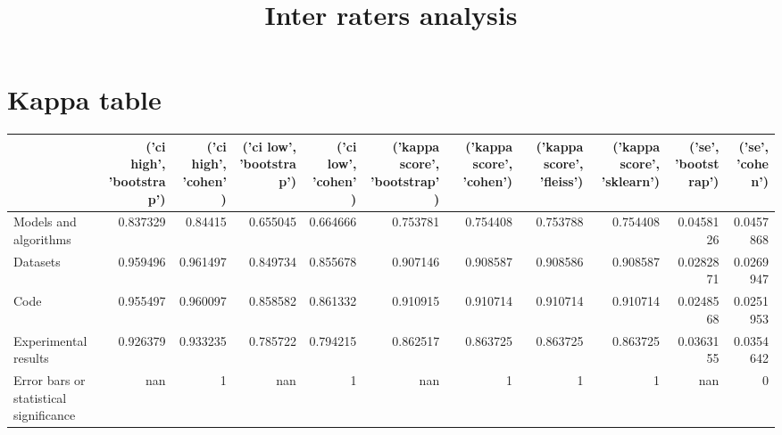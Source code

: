 \documentclass{article}
\title{Inter raters analysis}
\begin{document}
\maketitle

\section{Kappa table} 

\begin{table}[H]

\centering

\begin{tabular}{lrrrrrrrrrr}
\hline
                                        &   ('ci high', 'bootstrap') &   ('ci high', 'cohen') &   ('ci low', 'bootstrap') &   ('ci low', 'cohen') &   ('kappa score', 'bootstrap') &   ('kappa score', 'cohen') &   ('kappa score', 'fleiss') &   ('kappa score', 'sklearn') &   ('se', 'bootstrap') &   ('se', 'cohen') \\
\hline
 Models and algorithms                  &                   0.837329 &               0.84415  &                  0.655045 &              0.664666 &                       0.753781 &                   0.754408 &                    0.753788 &                     0.754408 &             0.0458126 &         0.0457868 \\
 Datasets                               &                   0.959496 &               0.961497 &                  0.849734 &              0.855678 &                       0.907146 &                   0.908587 &                    0.908586 &                     0.908587 &             0.0282871 &         0.0269947 \\
 Code                                   &                   0.955497 &               0.960097 &                  0.858582 &              0.861332 &                       0.910915 &                   0.910714 &                    0.910714 &                     0.910714 &             0.0248568 &         0.0251953 \\
 Experimental results                   &                   0.926379 &               0.933235 &                  0.785722 &              0.794215 &                       0.862517 &                   0.863725 &                    0.863725 &                     0.863725 &             0.0363155 &         0.0354642 \\
 Error bars or statistical significance &                 nan        &               1        &                nan        &              1        &                     nan        &                   1        &                    1        &                     1        &           nan         &         0         \\

\end{tabular}
\end{table}
\end{document}
